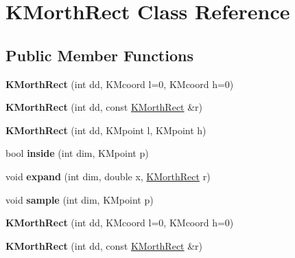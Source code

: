\hypertarget{class_k_morth_rect}{
\section{KMorthRect Class Reference}
\label{class_k_morth_rect}
}
\subsection*{Public Member Functions}
\begin{DoxyCompactItemize}
\item 
\hypertarget{class_k_morth_rect_af44932e3aa1a887a570cf7c30220e1f1}{
{\bfseries KMorthRect} (int dd, KMcoord l=0, KMcoord h=0)}
\label{class_k_morth_rect_af44932e3aa1a887a570cf7c30220e1f1}

\item 
\hypertarget{class_k_morth_rect_a6fe5543c5fb2aace7987d8a78fe8223a}{
{\bfseries KMorthRect} (int dd, const \hyperlink{class_k_morth_rect}{KMorthRect} \&r)}
\label{class_k_morth_rect_a6fe5543c5fb2aace7987d8a78fe8223a}

\item 
\hypertarget{class_k_morth_rect_aeed0dd407def4673f5933fd314ecd37e}{
{\bfseries KMorthRect} (int dd, KMpoint l, KMpoint h)}
\label{class_k_morth_rect_aeed0dd407def4673f5933fd314ecd37e}

\item 
\hypertarget{class_k_morth_rect_a8a4689ef509e82b97f1d3e15375c5599}{
bool {\bfseries inside} (int dim, KMpoint p)}
\label{class_k_morth_rect_a8a4689ef509e82b97f1d3e15375c5599}

\item 
\hypertarget{class_k_morth_rect_a3cbf082e32cb3476354e71454b8ec803}{
void {\bfseries expand} (int dim, double x, \hyperlink{class_k_morth_rect}{KMorthRect} r)}
\label{class_k_morth_rect_a3cbf082e32cb3476354e71454b8ec803}

\item 
\hypertarget{class_k_morth_rect_ace4676ba25c69020932b96bcb63383dc}{
void {\bfseries sample} (int dim, KMpoint p)}
\label{class_k_morth_rect_ace4676ba25c69020932b96bcb63383dc}

\item 
\hypertarget{class_k_morth_rect_af44932e3aa1a887a570cf7c30220e1f1}{
{\bfseries KMorthRect} (int dd, KMcoord l=0, KMcoord h=0)}
\label{class_k_morth_rect_af44932e3aa1a887a570cf7c30220e1f1}

\item 
\hypertarget{class_k_morth_rect_a6fe5543c5fb2aace7987d8a78fe8223a}{
{\bfseries KMorthRect} (int dd, const \hyperlink{class_k_morth_rect}{KMorthRect} \&r)}
\label{class_k_morth_rect_a6fe5543c5fb2aace7987d8a78fe8223a}


\end{DoxyCompactItemize}
